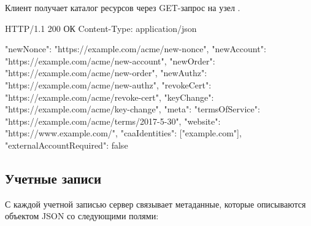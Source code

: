 Клиент получает каталог ресурсов через GET-запрос на узел .


HTTP/1.1 200 ОК
Content-Type: application/json

\begin{codeblock}
{
  "newNonce": "https://example.com/acme/new-nonce",
  "newAccount": "https://example.com/acme/new-account",
  "newOrder": "https://example.com/acme/new-order",
  "newAuthz": "https://example.com/acme/new-authz",
  "revokeCert": "https://example.com/acme/revoke-cert",
  "keyChange": "https://example.com/acme/key-change",
  "meta": {
    "termsOfService": "https://example.com/acme/terms/2017-5-30",
    "website": "https://www.example.com/",
    "caaIdentities": ["example.com"],
    "externalAccountRequired": false
  }
}
\end{codeblock}
\fi

\subsection{Учетные записи}\label{ACME.Res.Account}

С каждой учетной записью сервер связывает метаданные, которые описываются 
объектом JSON со следующими полями:

